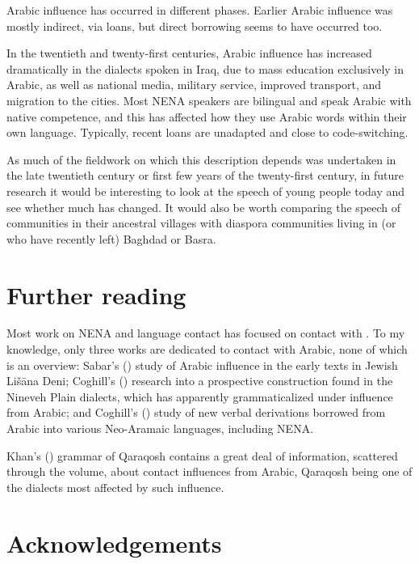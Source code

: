 \documentclass[output=paper]{langsci/langscibook}
\begin{document}
Arabic influence has occurred in different phases. Earlier Arabic influence was mostly indirect, via  loans, but direct borrowing seems to have occurred too.

In the twentieth and twenty-first centuries, Arabic influence has increased dramatically in the dialects spoken in Iraq, due to mass education exclusively in Arabic, as well as national media, military service, improved transport, and migration to the  cities. Most NENA speakers are bilingual and speak Arabic with native competence, and this has affected how they use Arabic words within their own language. Typically, recent loans are unadapted and close to {code-switching}.

As much of the fieldwork on which this description depends was undertaken in the late twentieth century or first few years of the twenty-first century, in {future} research it would be interesting to look at the speech of young people today and see whether much has changed. It would also be worth comparing the speech of communities in their ancestral villages with {diaspora} communities living in (or who have recently left) Baghdad or Basra.

\section*{Further reading}

Most work on NENA and language contact has focused on contact with . To my knowledge, only three works are dedicated to contact with Arabic, none of which is an overview: Sabar's (\citeyear{Sabar1984}) study of Arabic influence in the early texts in Jewish Lišāna Deni; Coghill’s (\citeyear{Coghill2010,Coghill2012}) research into a {prospective} construction found in the  Nineveh Plain dialects, which has apparently grammaticalized under influence from Arabic; and Coghill's (\citeyear{Coghill2015}) study of new verbal derivations borrowed from Arabic into various Neo-Aramaic languages, including NENA.

Khan's (\citeyear{Khan2002}) grammar of  Qaraqosh contains a great deal of information, scattered through the volume, about contact influences from Arabic, Qaraqosh being one of the dialects most affected by such influence.

\section*{Acknowledgements}
\end{document}
